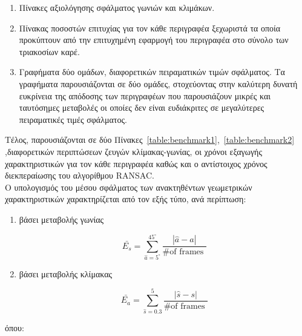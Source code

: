 \begin{enumerate}
 
  \item Πίνακες αξιολόγησης σφάλματος γωνιών και κλιμάκων.
  \item Πίνακας ποσοστών επιτυχίας για τον κάθε περιγραφέα ξεχωριστά τα οποία προκύπτουν από την επιτυχημένη εφαρμογή του περιγραφέα στο σύνολο των τριακοσίων καρέ.
  \item Γραφήματα δύο ομάδων, διαφορετικών πειραματικών τιμών σφάλματος. Tα γραφήματα παρουσιάζονται σε δύο ομάδες, στοχεύοντας στην 
  καλύτερη δυνατή ευκρίνεια της απόδοσης των περιγραφέων που παρουσιάζουν μικρές και ταυτόσημες μεταβολές οι οποίες δεν είναι ευδιάκριτες σε μεγαλύτερες πειραματικές τιμές σφάλματος.


\end{enumerate}


 Τέλος, παρουσιάζονται σε δύο Πίνακες~\ref{table:benchmark1},~\ref{table:benchmark2} ,διαφορετικών περιπτώσεων ζευγών κλίμακας-γωνίας, οι χρόνοι εξαγωγής χαρακτηριστικών για τον κάθε περιγραφέα καθώς και ο αντίστοιχος χρόνος 
 διεκπεραίωσης του αλγορίθμου RANSAC.\\
 Ο υπολογισμός του μέσου σφάλματος των ανακτηθέντων γεωμετρικών χαρακτηριστικών χαρακτηρίζεται από τον εξής τύπο, ανά περίπτωση:
 
 \begin{enumerate}

  \item βάσει μεταβολής γωνίας
  
    \begin{equation}
           \bar{E_s} = \sum_{{\hat{a}=5^{\circ}}}^{45^{\circ}} \frac{\left |\hat{a}-a  \right  |}{\text{\# of frames }}
    \end{equation}

  
  \item βάσει μεταβολής κλίμακας
 
    \begin{equation}
           \bar{E_a} = \sum_{{\hat{s}=0.3}}^{5} \frac{\left |\hat{s}-s  \right  |}{\text{\# of frames }}
    \end{equation}
 
 \end{enumerate}

 
όπου: \\ \\

